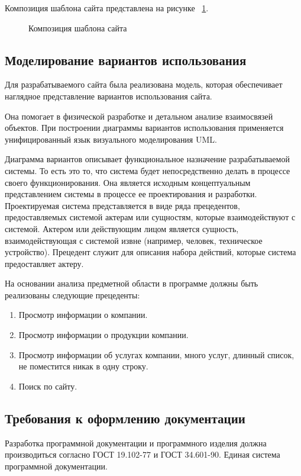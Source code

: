 Композиция шаблона сайта представлена на рисунке ~\ref{templ:image}.

\begin{figure}[H]
\caption{Композиция шаблона сайта}
\label{templ:image}
\end{figure}

\subsection{Моделирование вариантов использования}

Для разрабатываемого сайта была реализована модель, которая обеспечивает наглядное представление вариантов использования сайта.

Она помогает в физической разработке и детальном анализе взаимосвязей объектов. При построении диаграммы вариантов использования применяется унифицированный язык визуального моделирования UML.

Диаграмма вариантов описывает функциональное назначение разрабатываемой системы. То есть это то, что система будет непосредственно делать в процессе своего функционирования. Она является исходным концептуальным представлением системы в процессе ее проектирования и разработки. Проектируемая система представляется в виде ряда прецедентов, предоставляемых системой актерам или сущностям, которые взаимодействуют с системой. Актером или действующим лицом является сущность, взаимодействующая с системой извне (например, человек, техническое устройство). Прецедент служит для описания набора действий, которые система предоставляет актеру.

На основании анализа предметной области в программе должны быть реализованы следующие прецеденты:
\begin{enumerate}
\item Просмотр информации о компании.
\item Просмотр информации о продукции компании.
\item Просмотр информации об услугах компании, много услуг, длинный список, не поместится никак в одну строку.
\item Поиск по сайту.
\end{enumerate}

\subsection{Требования к оформлению документации}

Разработка программной документации и программного изделия должна производиться согласно ГОСТ 19.102-77 и ГОСТ 34.601-90. Единая система программной документации.
